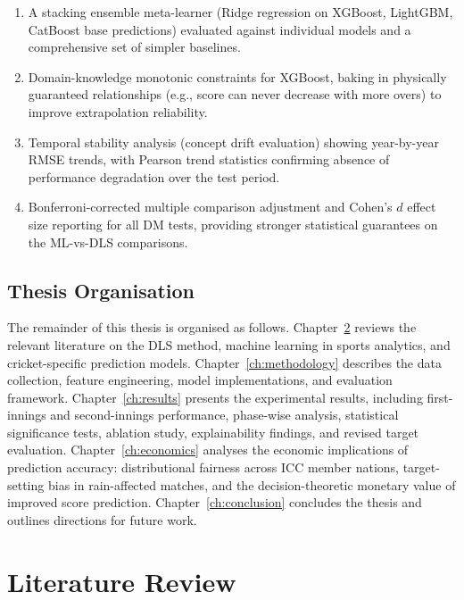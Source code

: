\documentclass[12pt,a4paper,oneside]{report}
\begin{document}
\begin{enumerate}
    \item A stacking ensemble meta-learner (Ridge regression on XGBoost, LightGBM, CatBoost base predictions) evaluated against individual models and a comprehensive set of simpler baselines.

    \item Domain-knowledge monotonic constraints for XGBoost, baking in physically guaranteed relationships (e.g., score can never decrease with more overs) to improve extrapolation reliability.

    \item Temporal stability analysis (concept drift evaluation) showing year-by-year RMSE trends, with Pearson trend statistics confirming absence of performance degradation over the test period.

    \item Bonferroni-corrected multiple comparison adjustment and Cohen's $d$ effect size reporting for all DM tests, providing stronger statistical guarantees on the ML-vs-DLS comparisons.
\end{enumerate}

\section{Thesis Organisation}

The remainder of this thesis is organised as follows. Chapter~\ref{ch:literature} reviews the relevant literature on the DLS method, machine learning in sports analytics, and cricket-specific prediction models. Chapter~\ref{ch:methodology} describes the data collection, feature engineering, model implementations, and evaluation framework. Chapter~\ref{ch:results} presents the experimental results, including first-innings and second-innings performance, phase-wise analysis, statistical significance tests, ablation study, explainability findings, and revised target evaluation. Chapter~\ref{ch:economics} analyses the economic implications of prediction accuracy: distributional fairness across ICC member nations, target-setting bias in rain-affected matches, and the decision-theoretic monetary value of improved score prediction. Chapter~\ref{ch:conclusion} concludes the thesis and outlines directions for future work.


\chapter{Literature Review}
\label{ch:literature}
\end{document}
